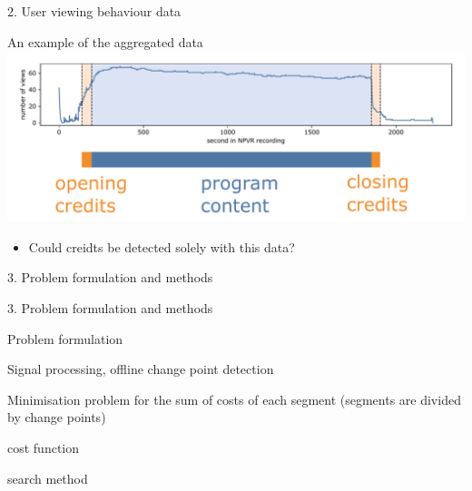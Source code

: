 \documentclass[first=orange,second=blue,logo=blueque]{aaltoslides}
\newcommand{\SubItem}[1]{
    {\setlength\itemindent{15pt} \item[$\bullet$] #1}
}
\begin{document}
\begin{frame}{2. User viewing behaviour data}
    \begin{block}{{\color{black}An example of the aggregated data}}
        \includegraphics[width=1\textwidth]{figures/data1.pdf}
        \begin{itemize}
            \item Could creidts be detected solely with this data?
        \end{itemize}
    \end{block}
\end{frame}


\begin{frame}{3. Problem formulation and methods}
\end{frame}


\begin{frame}{3. Problem formulation and methods}
    \begin{block}{{\color{black}Problem formulation}}
        \begin{itemize}
            \item Signal processing, offline change point detection %
            \item Minimisation problem for the sum of costs of each segment (segments are divided by change points)
                \SubItem{cost function}
                \SubItem{search method}
        \end{itemize}
    \end{block}
\end{frame}
\end{document}

